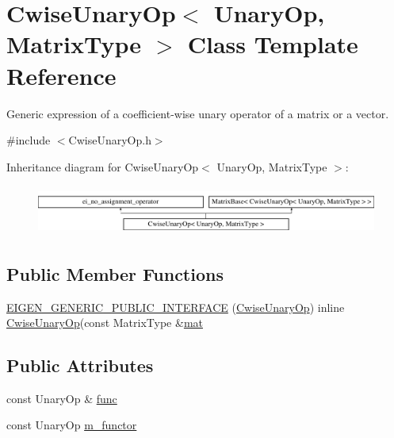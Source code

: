 \hypertarget{class_cwise_unary_op}{\section{Cwise\-Unary\-Op$<$ Unary\-Op, Matrix\-Type $>$ Class Template Reference}
\label{class_cwise_unary_op}
}


Generic expression of a coefficient-\/wise unary operator of a matrix or a vector.  




{\ttfamily \#include $<$Cwise\-Unary\-Op.\-h$>$}

Inheritance diagram for Cwise\-Unary\-Op$<$ Unary\-Op, Matrix\-Type $>$\-:\begin{figure}[H]
\begin{center}
\leavevmode
\includegraphics[height=1.651917cm]{class_cwise_unary_op}
\end{center}
\end{figure}
\subsection*{Public Member Functions}
\begin{DoxyCompactItemize}
\item 
\hyperlink{class_cwise_unary_op_a3d525a4068d702afd9ef28a8b1c5cba9}{E\-I\-G\-E\-N\-\_\-\-G\-E\-N\-E\-R\-I\-C\-\_\-\-P\-U\-B\-L\-I\-C\-\_\-\-I\-N\-T\-E\-R\-F\-A\-C\-E} (\hyperlink{class_cwise_unary_op}{Cwise\-Unary\-Op}) inline \hyperlink{class_cwise_unary_op}{Cwise\-Unary\-Op}(const Matrix\-Type \&\hyperlink{uavobjecttemplate_8m_a16a51e808b16c46bbfd36da2e37cd123}{mat}
\end{DoxyCompactItemize}
\subsection*{Public Attributes}
\begin{DoxyCompactItemize}
\item 
const Unary\-Op \& \hyperlink{class_cwise_unary_op_a608cad092bb09856a77613029f256bdb}{func}
\item 
const Unary\-Op \hyperlink{class_cwise_unary_op_ac8582aef8496b60bfb945e9a68c8f7e1}{m\-\_\-functor}
\end{DoxyCompactItemize}
